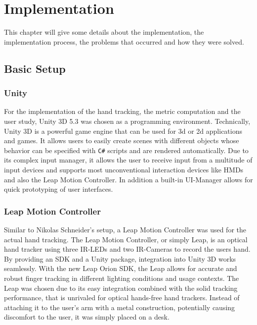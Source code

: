 \chapter{Implementation}\label{chapter:implementation}

This chapter will give some details about the implementation, the implementation process, the problems that occurred and how they were solved.

\section{Basic Setup}

\subsection{Unity}

For the implementation of the hand tracking, the metric computation and the user study, Unity 3D 5.3 was chosen as a programming environment. Technically, Unity 3D is a powerful game engine that can be used for 3d or 2d applications and games. It allows users to easily create scenes with different objects whose behavior can be specified with \texttt{C\#} scripts and are rendered automatically. Due to its complex input manager, it allows the user to receive input from a multitude of input devices and supports most unconventional interaction devices like HMDs and also the Leap Motion Controller. In addition a built-in UI-Manager allows for quick prototyping of user interfaces. 

\subsection{Leap Motion Controller}

Similar to Nikolas Schneider's setup, a Leap Motion Controller was used for the actual hand tracking. The Leap Motion Controller, or simply Leap, is an optical hand tracker using three IR-LEDs and two IR-Cameras to record the users hand. By providing an SDK and a Unity package, integration into Unity 3D works seamlessly. With the new Leap Orion SDK, the Leap allows for accurate and robust finger tracking in different lighting conditions and usage contexts. The Leap was chosen due to its easy integration combined with the solid tracking performance, that is unrivaled for optical hands-free hand trackers.  
Instead of attaching it to the user's arm with a metal construction, potentially causing discomfort to the user, it was simply placed on a desk. 

